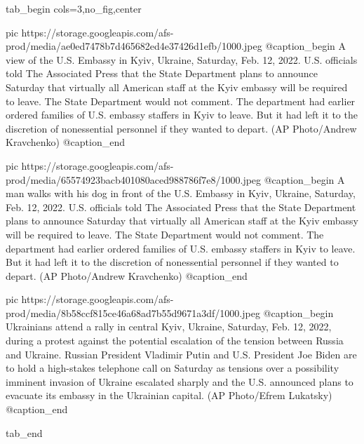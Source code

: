  
 
 
 
 


\ifcmt
  tab_begin cols=3,no_fig,center

     pic https://storage.googleapis.com/afs-prod/media/ae0ed7478b7d465682ed4e37426d1efb/1000.jpeg
		 @caption_begin
A view of the U.S. Embassy in Kyiv, Ukraine, Saturday, Feb. 12, 2022. U.S.
officials told The Associated Press that the State Department plans to announce
Saturday that virtually all American staff at the Kyiv embassy will be required
to leave. The State Department would not comment. The department had earlier
ordered families of U.S. embassy staffers in Kyiv to leave. But it had left it
to the discretion of nonessential personnel if they wanted to depart. (AP
Photo/Andrew Kravchenko)
		 @caption_end

		 pic https://storage.googleapis.com/afs-prod/media/65574923bacb401080aced988786f7e8/1000.jpeg
		 @caption_begin
A man walks with his dog in front of the U.S. Embassy in Kyiv, Ukraine,
Saturday, Feb. 12, 2022. U.S. officials told The Associated Press that the
State Department plans to announce Saturday that virtually all American staff
at the Kyiv embassy will be required to leave. The State Department would not
comment. The department had earlier ordered families of U.S. embassy staffers
in Kyiv to leave. But it had left it to the discretion of nonessential
personnel if they wanted to depart. (AP Photo/Andrew Kravchenko)
		 @caption_end

		 pic https://storage.googleapis.com/afs-prod/media/8b58ccf815ce46a68ad7b55d9671a3df/1000.jpeg
		 @caption_begin
Ukrainians attend a rally in central Kyiv, Ukraine, Saturday, Feb. 12, 2022,
during a protest against the potential escalation of the tension between Russia
and Ukraine. Russian President Vladimir Putin and U.S. President Joe Biden are
to hold a high-stakes telephone call on Saturday as tensions over a possibility
imminent invasion of Ukraine escalated sharply and the U.S. announced plans to
evacuate its embassy in the Ukrainian capital. (AP Photo/Efrem Lukatsky)
		 @caption_end

  tab_end
\fi
